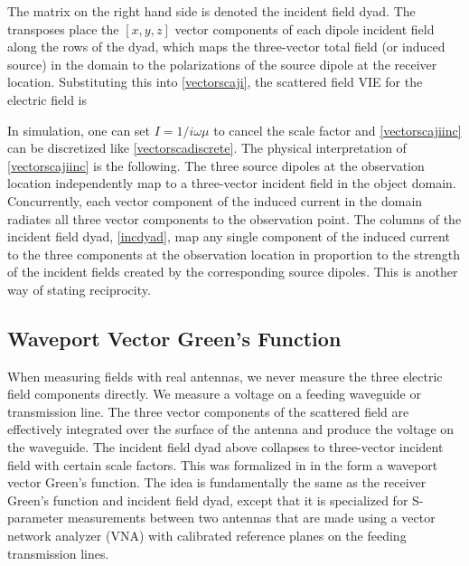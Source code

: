 The matrix on the right hand side is denoted the incident field dyad. The transposes place the $[x,y,z]$ vector components of each dipole incident field along the rows of the dyad, which maps the three-vector total field (or induced source) in the domain to the polarizations of the source dipole at the receiver location. Substituting this into \eqref{vectorscaji}, the scattered field VIE for the electric field is

In simulation, one can set $I = 1/i\omega\mu$ to cancel the scale factor and \eqref{vectorscajiinc} can be discretized like \eqref{vectorscadiscrete}. The physical interpretation of \eqref{vectorscajiinc} is the following. The three source dipoles at the observation location independently map to a three-vector incident field in the object domain. Concurrently, each vector component of the induced current in the domain radiates all three vector components to the observation point. The columns of the incident field dyad, \eqref{incdyad}, map any single component of the induced current to the three components at the observation location in proportion to the strength of the incident fields created by the corresponding source dipoles. This is another way of stating reciprocity. %


\subsection{Waveport Vector Green's Function}
When measuring fields with real antennas, we never measure the three electric field components directly. We measure a voltage on a feeding waveguide or transmission line. The three vector components of the scattered field are effectively integrated over the surface of the antenna and produce the voltage on the waveguide. The incident field dyad above collapses to three-vector incident field with certain scale factors. This was formalized in \cite{haynes2012vector} in the form a waveport vector Green's function. The idea is fundamentally the same as the receiver Green's function and incident field dyad, except that it is specialized for S-parameter measurements between two antennas that are made using a vector network analyzer (VNA) with calibrated reference planes on the feeding transmission lines. 

